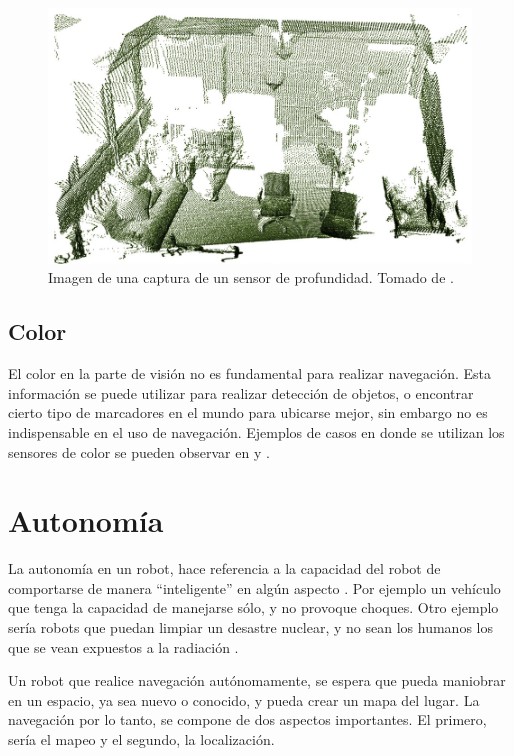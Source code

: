 \begin{figure}[H]
\centering
\includegraphics[scale=0.3]{imagenes/rviz_pointcloud.png}
\caption{Imagen de una captura de un sensor de profundidad. Tomado de \cite{Rusu2011}.}
\label{F:pointcloud}
\end{figure}

\subsection{Color}

El color en la parte de visión no es fundamental para realizar navegación. Esta información se puede utilizar para realizar detección de objetos, o encontrar cierto tipo de marcadores en el mundo para ubicarse mejor, sin embargo no es indispensable en el uso de navegación. Ejemplos de casos en donde se utilizan los sensores de color se pueden observar en \cite{Manduchi2005} y \cite{Lai2011}.


\section{Autonomía}

La autonomía en un robot, hace referencia a la capacidad del robot de comportarse de manera ``inteligente'' en algún aspecto \cite{Thrun2005}. Por ejemplo un vehículo que tenga la capacidad de manejarse sólo, y no provoque choques. Otro ejemplo sería robots que puedan limpiar un desastre nuclear, y no sean los humanos los que se vean expuestos a la radiación \cite{Thrun2005}.

Un robot que realice navegación autónomamente, se espera que pueda maniobrar en un espacio, ya sea nuevo o conocido, y pueda crear un mapa del lugar. La navegación por lo tanto, se compone de dos aspectos importantes. El primero, sería el mapeo y el segundo, la localización.

